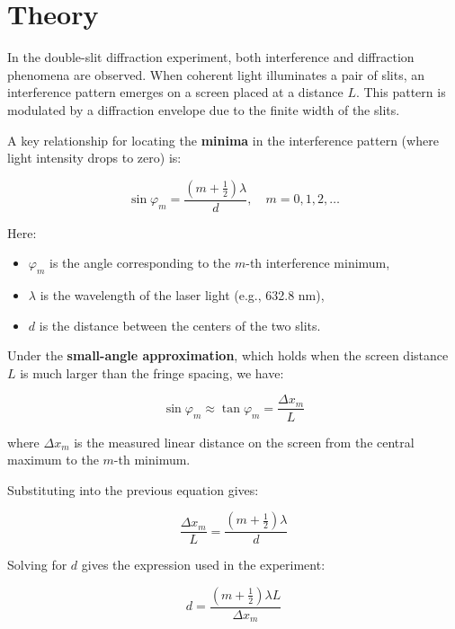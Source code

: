 \documentclass[journal]{IEEEtran}
\begin{document}
\section*{Theory}

In the double-slit diffraction experiment, both interference and diffraction phenomena are observed. When coherent light illuminates a pair of slits, an interference pattern emerges on a screen placed at a distance \( L \). This pattern is modulated by a diffraction envelope due to the finite width of the slits.

A key relationship for locating the \textbf{minima} in the interference pattern (where light intensity drops to zero) is:

\cite{lab_manual}

\begin{equation}
\sin \varphi_m = \frac{(m + \tfrac{1}{2}) \lambda}{d}, \quad m = 0, 1, 2, \ldots
\end{equation}

Here:
\begin{itemize}
    \item \( \varphi_m \) is the angle corresponding to the \( m \)-th interference minimum,
    \item \( \lambda \) is the wavelength of the laser light (e.g., 632.8 nm),
    \item \( d \) is the distance between the centers of the two slits.
\end{itemize}

Under the \textbf{small-angle approximation}, which holds when the screen distance \( L \) is much larger than the fringe spacing, we have:

\begin{equation}
\sin \varphi_m \approx \tan \varphi_m = \frac{\Delta x_m}{L}
\end{equation}

where \( \Delta x_m \) is the measured linear distance on the screen from the central maximum to the \( m \)-th minimum.

Substituting into the previous equation gives:

\begin{equation}
\frac{\Delta x_m}{L} = \frac{(m + \tfrac{1}{2}) \lambda}{d}
\end{equation}

Solving for \( d \) gives the expression used in the experiment:

\begin{equation}
d = \frac{(m + \tfrac{1}{2}) \lambda L}{\Delta x_m}
\end{equation}
\end{document}
